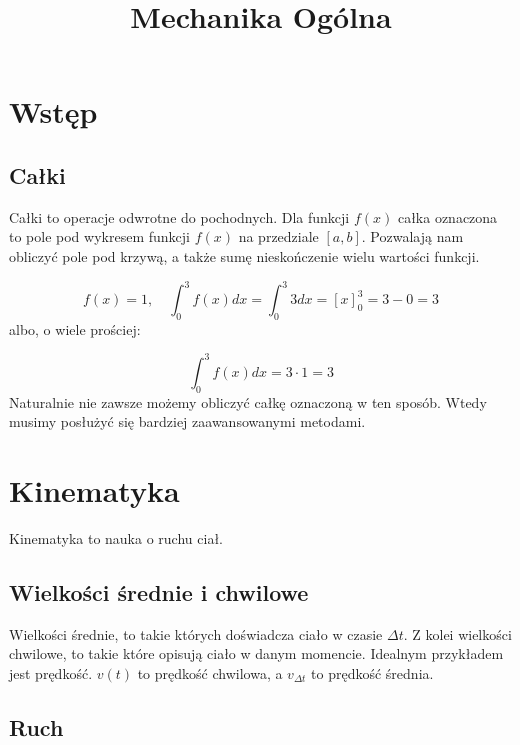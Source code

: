 \documentclass{../notatki}
\title{Mechanika Ogólna}
\begin{document}
\tableofcontents

\setcounter{section}{-1}

\section{Wstęp}

\subsection{Całki}

Całki to operacje odwrotne do pochodnych. Dla funkcji $f(x)$ całka oznaczona
to pole pod wykresem funkcji $f(x)$ na przedziale $[a, b]$. Pozwalają nam
obliczyć pole pod krzywą, a także sumę nieskończenie wielu wartości funkcji.

\begin{figure*}[h]
  \centering
\end{figure*}

$$
f(x) = 1, \quad \int_0^3 f(x) dx = \int_0^3 3 dx =\left[x\right]^3_0 = 3 - 0 = 3
$$
albo, o wiele prościej:

$$
\int_0^3 f(x) dx = 3 \cdot 1 = 3
$$
Naturalnie nie zawsze możemy obliczyć całkę oznaczoną w ten sposób. Wtedy
musimy posłużyć się bardziej zaawansowanymi metodami.

\section{Kinematyka}

Kinematyka to nauka o ruchu ciał.

\subsection{Wielkości średnie i chwilowe}

Wielkości średnie, to takie których doświadcza ciało w czasie $\Delta t$.
Z kolei wielkości chwilowe, to takie które opisują ciało w danym momencie.
Idealnym przykładem jest prędkość. $v(t)$ to prędkość chwilowa, a $v_{\Delta t}$
to prędkość średnia.

\subsection{Ruch}
\end{document}
